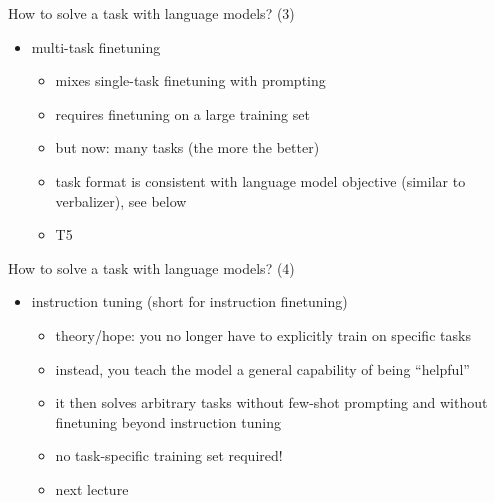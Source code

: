 \begin{frame}{How to solve a task with language models? (3)}

\vfill

\begin{itemize}
\item multi-task finetuning
        \begin{itemize}
            \item mixes single-task finetuning with prompting
        \item requires finetuning on a large training set
        \item but now: many tasks (the more the better)
        \item task format is consistent with language model
            objective (similar to verbalizer), see below
            \item T5
        \end{itemize}
\end{itemize}

\vfill

\end{frame}

\begin{frame}{How to solve a task with language models? (4)}

\vfill

\begin{itemize}
\item instruction tuning (short for instruction finetuning)
        \begin{itemize}
            \item theory/hope: you no longer have to explicitly
            train on specific tasks
            \item instead, you teach the model a general
            capability of being ``helpful''
            \item it then solves arbitrary tasks without few-shot
            prompting and without finetuning beyond instruction tuning
            \item no task-specific training set required!
            \item next lecture
        \end{itemize}
\end{itemize}

\vfill

\end{frame}


